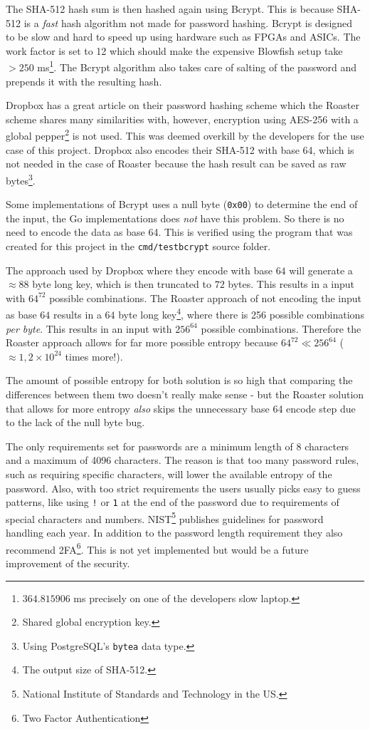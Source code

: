 \documentclass[12pt,a4paper]{report}
\begin{document}
The SHA-512 hash sum is then hashed again using Bcrypt. This is because
SHA-512 is a \textit{fast} hash algorithm not made for password hashing. Bcrypt is
designed to be slow and hard to speed up using hardware such as FPGAs and
ASICs. The work factor is set to 12 which should make the expensive Blowfish
setup take $> 250$ ms\footnote{$364.815906$ ms precisely on one of the developers slow laptop.}.
The Bcrypt algorithm also takes care of salting of the password and prepends 
it with the resulting hash.


Dropbox has a great article\cite{dropbox-passwords} on their password hashing scheme
which the Roaster scheme shares many similarities with, however, encryption using AES-256
with a global pepper\footnote{Shared global encryption key.} is not used. This was deemed overkill 
by the developers for the use case of this project. Dropbox also encodes their SHA-512 with base 64,
which is not needed in the case of Roaster because the hash result can be saved as raw
bytes\footnote{Using PostgreSQL's \texttt{bytea} data type.}.

Some implementations of Bcrypt uses a null byte (\texttt{0x00}) to determine the end
of the input\cite{bcrypt-bug}, the Go implementations does \textit{not} have this problem. So there
is no need to encode the data as base 64. This is verified using the program that was created for
this project in the \texttt{cmd/testbcrypt} source folder.

The approach used by Dropbox where they encode with base $64$ will generate a
$\approx 88$ byte long key, which is then truncated to $72$ bytes. This results in a
input with $64^{72}$ possible combinations. The Roaster approach of not encoding the
input as base $64$ results in a $64$ byte long key\footnote{The output size of SHA-512.},
where there is 256 possible combinations \textit{per byte}. This results in an input
with $256^{64}$ possible combinations. Therefore the Roaster approach allows for far more
possible entropy because $64^{72} \ll 256^{64}$ ($\approx 1,2 \times 10^{24}$ times more!).

The amount of possible entropy for both solution is so high that comparing the differences
between them two doesn't really make sense - but the Roaster solution that allows for more entropy
\textit{also} skips the unnecessary base 64 encode step due to the lack of the null byte bug.

The only requirements set for passwords are a minimum length of 8 characters and a maximum of 4096 characters. The reason is that too many password rules, such as requiring specific characters, will lower the available entropy of the password. Also, with too strict requirements the users usually picks easy to guess patterns, like using \texttt{!} or \texttt{1} at the end of the password due to requirements of special characters and numbers\cite{oauth-nist}. NIST\footnote{National Institute of Standards and Technology in the US.} publishes guidelines for password handling each year. In addition to the password length requirement they also recommend 2FA\footnote{Two Factor Authentication}\cite{nist-passwords}. This is not yet implemented but would be a future improvement of the security.
\end{document}
